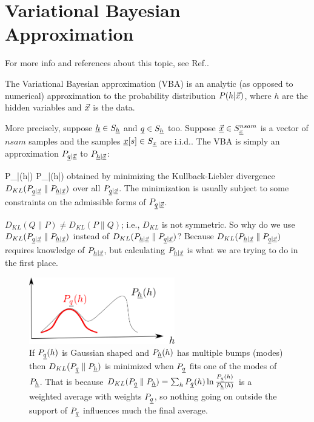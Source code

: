 \chapter{Variational Bayesian Approximation}

For more info and references about
this topic, see Ref.\cite{wiki-var-bay}.

The Variational Bayesian approximation (VBA)
is an analytic 
(as opposed to numerical) approximation
to the probability 
distribution $P(h|{\vec{x}})$,
where $h$ are the hidden variables 
and ${\vec{x}}$ is the data. 


More precisely, suppose ${\underline{h}}\in S_{\underline{h}}$ and ${\underline{q}}\in S_{\underline{h}}$ too.
Suppose $\vec{{\underline{x}}}\in S_{\underline{x}}^{nsam}$
 is a vector of $nsam$ samples
and the samples ${\underline{x}}[s]\in S_{\underline{x}}$ are i.i.d..
 The VBA is simply 
an approximation
$P_{{\underline{q}}|\vec{{\underline{x}}}}$ to
$P_{{\underline{h}}|\vec{{\underline{x}}}}$:


\beq
P_{\rvh|\vec{\rvx}}(h|\vecx)
\approx P_{\rvq|\vec{\rvx}}(h|\vecx)
\eeq
obtained by minimizing the Kullback-Liebler divergence
$D_{KL}(P_{{\underline{q}}|\vec{{\underline{x}}}}\parallel
P_{{\underline{h}}|\vec{{\underline{x}}}})$
over all 
$P_{{\underline{q}}|\vec{{\underline{x}}}}$. The minimization
is 
usually subject to some constraints
on the admissible forms of 
$P_{{\underline{q}}|\vec{{\underline{x}}}}$.


$D_{KL}(Q\parallel P)\neq
D_{KL}(P\parallel Q)$; i.e.,  $D_{KL}$ is not
symmetric. So why do we use 
$D_{KL}(P_{{\underline{q}}|\vec{{\underline{x}}}}\parallel
P_{{\underline{h}}|\vec{{\underline{x}}}})$
instead of 
$D_{KL}(
P_{{\underline{h}}|\vec{{\underline{x}}}}\parallel P_{{\underline{q}}|\vec{{\underline{x}}}})$?
Because 
$D_{KL}(
P_{{\underline{h}}|\vec{{\underline{x}}}}\parallel P_{{\underline{q}}|\vec{{\underline{x}}}})$
requires knowledge of $P_{{\underline{h}}|\vec{{\underline{x}}}}$,
but calculating $P_{{\underline{h}}|\vec{{\underline{x}}}}$
is what we are trying to do in the first place.

\begin{figure}[h!]
\centering
\includegraphics[width=2.5in]
{var-bay/kl-q-support.png}
\caption{
If $P_{\underline{q}}(h)$
is Gaussian shaped 
and $P_{\underline{h}}(h)$
has multiple
bumps (modes)
then 
$D_{KL}(P_{\underline{q}}\parallel P_{\underline{h}})$
is minimized when $P_{\underline{q}}$
fits one of the modes of $P_{\underline{h}}$.
That is because $D_{KL}(P_{\underline{q}}\parallel P_{\underline{h}})=
\sum_h P_{\underline{q}}(h)\ln \frac{P_{\underline{q}}(h)}{P_{\underline{h}}(h)}$
is a weighted average with weights $P_{\underline{q}}$,
so nothing going on outside the support
of $P_{\underline{q}}$ influences  much
the final average.
}
\label{fig-kl-q-support}
\end{figure}



